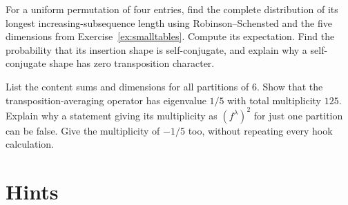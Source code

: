 \begin{exercise}[$\star\star$]\label{ex:v10new-ch10-plancherel4}
For a uniform permutation of four entries, find the complete distribution of its longest increasing-subsequence length using Robinson--Schensted and the five dimensions from Exercise~\ref{ex:smalltables}. Compute its expectation. Find the probability that its insertion shape is self-conjugate, and explain why a self-conjugate shape has zero transposition character.
\end{exercise}

\begin{exercise}[$\star\star\star$]\label{ex:v10new-ch10-collisions}
List the content sums and dimensions for all partitions of $6$. Show that the transposition-averaging operator has eigenvalue $1/5$ with total multiplicity $125$. Explain why a statement giving its multiplicity as $(f^\lambda)^2$ for just one partition can be false. Give the multiplicity of $-1/5$ too, without repeating every hook calculation.
\end{exercise}

\section{Hints}

